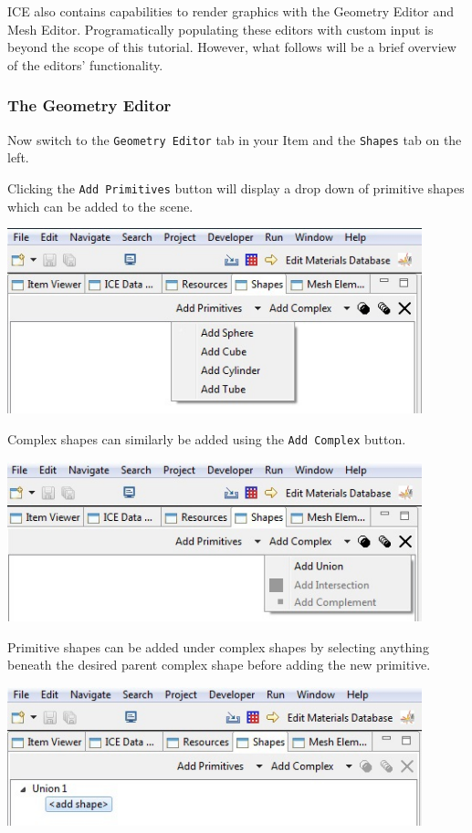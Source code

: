 \documentclass{article}
\begin{document}
ICE also contains capabilities to render graphics with the Geometry Editor and
Mesh Editor. Programatically populating these editors with custom input is
beyond the scope of this tutorial. However, what follows will be a brief
overview of the editors' functionality.

\subsubsection{The Geometry Editor}

Now switch to the \texttt{Geometry Editor} tab in your Item and the
\texttt{Shapes} tab on the left.

Clicking the \texttt{Add Primitives} button will display a drop down of
primitive shapes which can be added to the scene.

\begin{center}
\includegraphics[width=12cm]{images/AddPrimitiveShape}
\end{center}

Complex shapes can similarly be added using the \texttt{Add Complex} button.

\begin{center}
\includegraphics[width=12cm]{images/AddComplexShape}
\end{center}

Primitive shapes can be added under complex shapes by selecting anything beneath
the desired parent complex shape before adding the new primitive.

\begin{center}
\includegraphics[width=12cm]{images/ComplexShapeTree}
\end{center}
\end{document}
